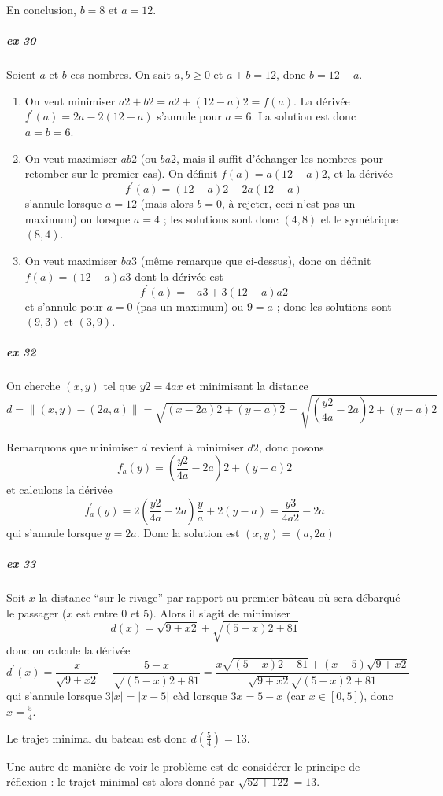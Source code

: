 En conclusion, $b = 8$ et $a = 12$.

\subparagraph{ex 30} Soient $a$ et $b$ ces nombres. On sait $a, b \geq
0$ et $a+b = 12$, donc $b = 12 - a$.
\begin{enumerate}
\item On veut minimiser $a2+ b2 = a2 + (12-a)2 = f(a)$. La dérivée
  $f^\prime(a) = 2a - 2 (12 - a)$ s'annule pour $a = 6$. La solution
  est donc $a = b = 6$.

\item On veut maximiser $a b2$ (ou $ba2$, mais il suffit d'échanger
  les nombres pour retomber sur le premier cas). On définit $f(a) = a
  (12-a)2$, et la dérivée
  \begin{equation*}
    f^\prime(a) = (12-a)2 - 2 a (12-a)
  \end{equation*}
  s'annule lorsque $a = 12$ (mais alors $b = 0$, à rejeter, ceci n'est
  pas un maximum) ou lorsque $a = 4$ ; les solutions sont donc $(4,8)$
  et le symétrique $(8,4)$.

\item On veut maximiser $ba3$ (même remarque que ci-dessus), donc on
  définit
  \begin{math}
    f(a) = (12-a) a3
  \end{math}
  dont la dérivée est
  \begin{equation*}
    f^\prime(a) = -a3 + 3 (12-a)a2
  \end{equation*}
  et s'annule pour $a = 0$ (pas un maximum) ou $9 = a$ ; donc les
  solutions sont $(9,3)$ et $(3,9)$.
\end{enumerate}

\subparagraph{ex 32}
On cherche $(x,y)$ tel que $y2 = 4ax$ et minimisant la distance
\begin{equation*}
d = \| (x,y)-(2a,a) \| = \sqrt{(x-2a)2 + (y-a)2} =
\sqrt{\left(\frac{y2}{4a}-2a\right)2 + (y-a)2}
\end{equation*}

Remarquons que minimiser $d$ revient à minimiser $d2$, donc posons
\begin{equation*}
f_a(y) = \left(\frac{y2}{4a}-2a\right)2 + (y-a)2
\end{equation*}
et calculons la dérivée
\begin{equation*}
  f_a^\prime(y)  = 2 \left(\frac{y2}{4a}-2a\right) \frac y a + 2
  (y-a) = \frac{y3}{4a2}-2a
\end{equation*}
qui s'annule lorsque $y = 2a$. Donc la solution est $(x,y) = (a,2a)$

\subparagraph{ex 33}
Soit $x$ la distance ``sur le rivage'' par rapport au premier bâteau
où sera débarqué le passager ($x$ est entre $0$ et $5$). Alors il
s'agit de minimiser
\begin{equation*}
  d(x) = \sqrt{9+x2} + \sqrt{(5-x)2 + 81}
\end{equation*}
donc on calcule la dérivée
\begin{equation*}
  d^\prime(x) = \frac{x}{\sqrt{9+x2}} - \frac{5-x}{\sqrt{(5-x)2 + 81}}
 = \frac{x\sqrt{(5-x)2 + 81} + (x-5)\sqrt{9+x2}}{\sqrt{9+x2}\sqrt{(5-x)2 + 81}}
\end{equation*}
qui s'annule lorsque $3 |x| = |x-5|$ càd lorsque $3x = 5 - x$
(car $x \in [0,5]$), donc $x = \frac{5}{4}$.

Le trajet minimal du bateau est donc $d(\frac{5}{4}) = 13$.

Une autre de manière de voir le problème est de considérer le principe
de réflexion : le trajet minimal est alors donné par $\sqrt{52 +
  122} = 13$.

